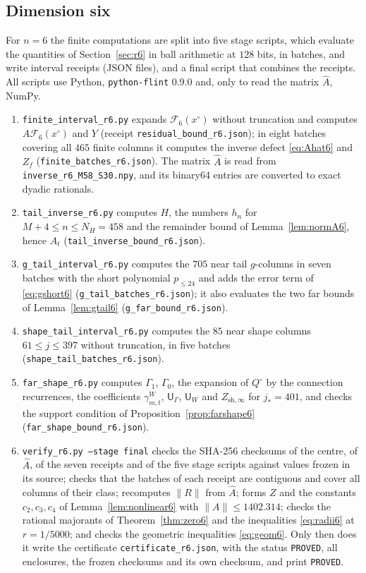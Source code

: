\documentclass[11pt]{amsart}
\theoremstyle{definition}
\theoremstyle{remark}
\numberwithin{equation}{section}
\newcommand{\Fc}{\mathcal{F}}
\newcommand{\jst}{j_*}
\newcommand{\sU}{\mathsf{U}}
\newcommand{\nrm}[1]{\lVert #1\rVert}
\begin{document}
\subsection{Dimension six}\label{subsec:cap6}
{\sloppy For $n=6$ the finite computations are split into five stage scripts, which evaluate the quantities of Section~\ref{sec:r6} in ball arithmetic at $128$ bits, in batches, and write interval receipts (JSON files), and a final script that combines the receipts. All scripts use Python, \texttt{python-flint} 0.9.0 and, only to read the matrix $\widehat A$, NumPy.
\begin{enumerate}[label=(\arabic*)]
\item \texttt{finite\_interval\_r6.py} expands $\Fc_6(x^\circ)$ without truncation and computes $A\Fc_6(x^\circ)$ and $Y$ (receipt \texttt{residual\_bound\_r6.json}); in eight batches covering all $465$ finite columns it computes the inverse defect \eqref{eq:Ahat6} and $Z_f$ (\texttt{finite\_batches\_r6.json}). The matrix $\widehat A$ is read from \texttt{inverse\_r6\_M58\_S30.npy}, and its binary64 entries are converted to exact dyadic rationals.
\item \texttt{tail\_inverse\_r6.py} computes $H$, the numbers $h_n$ for $M+4\leq n\leq N_H=458$ and the remainder bound of Lemma~\ref{lem:normA6}, hence $A_t$ (\texttt{tail\_inverse\_bound\_r6.json}).
\item \texttt{g\_tail\_interval\_r6.py} computes the $705$ near tail $g$-columns in seven batches with the short polynomial $p_{\leq24}$ and adds the error term of \eqref{eq:gshort6} (\texttt{g\_tail\_batches\_r6.json}); it also evaluates the two far bounds of Lemma~\ref{lem:gtail6} (\texttt{g\_far\_bound\_r6.json}).
\item \texttt{shape\_tail\_interval\_r6.py} computes the $85$ near shape columns $61\leq j\leq397$ without truncation, in five batches (\texttt{shape\_tail\_batches\_r6.json}).
\item \texttt{far\_shape\_r6.py} computes $\Gamma_1$, $\Gamma_0$, the expansion of $Q^\circ$ by the connection recurrences, the coefficients $\gamma^W_{m,t}$, $\sU_\Gamma$, $\sU_W$ and $Z_{\mathrm{sh},\infty}$ for $\jst=401$, and checks the support condition of Proposition~\ref{prop:farshape6} (\texttt{far\_shape\_bound\_r6.json}).
\item \texttt{verify\_r6.py --stage final} checks the SHA-256 checksums of the centre, of $\widehat A$, of the seven receipts and of the five stage scripts against values frozen in its source; checks that the batches of each receipt are contiguous and cover all columns of their class; recomputes $\nrm R$ from $\widehat A$; forms $Z$ and the constants $c_2,c_3,c_4$ of Lemma~\ref{lem:nonlinear6} with $\nrm A\leq1402.314$; checks the rational majorants of Theorem~\ref{thm:zero6} and the inequalities \eqref{eq:radii6} at $r=1/5000$; and checks the geometric inequalities \eqref{eq:geom6}. Only then does it write the certificate \texttt{certificate\_r6.json}, with the status \texttt{PROVED}, all enclosures, the frozen checksums and its own checksum, and print \texttt{PROVED}.

\end{enumerate}}
\end{document}
